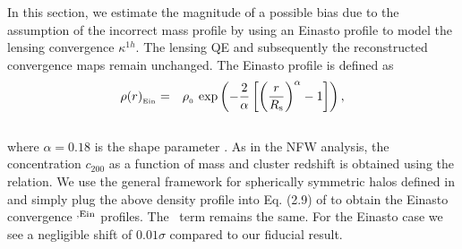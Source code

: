 In this section, we estimate the magnitude of a possible bias due to the assumption of the incorrect mass profile by using an Einasto profile \citep{einasto89} to model the lensing convergence $\kappa^{1h}$.
The lensing QE and subsequently the reconstructed convergence maps remain unchanged.
The Einasto profile is defined as
\begin{eqnarray}
\rho(r)_{_{\rm Ein}} & = &  \rho_{_{0}}\ \mbox{exp}\left( - \frac{2}{\alpha} \left[\left(\frac{r}{R_{\rm s}} \right)^{\alpha} - 1\right]\right),
\label{eq_einasto_density}
\end{eqnarray}\\
where $\alpha = 0.18$ is the shape parameter \citep{ludlow13}. 
As in the NFW analysis, the concentration $c_{200}$ as a function of mass and cluster redshift is obtained using the \citet{duffy08} relation.
We use the general framework for spherically symmetric halos defined in \cite{raghunathan17a} and simply plug the above density profile into Eq. (2.9) of \cite{raghunathan17a} to obtain the Einasto convergence \kappaonehalo$^{,\rm Ein}$ profiles. The \kappatwohalo\ term remains the same. For the Einasto case we see a negligible shift of $0.01\sigma$ compared to our fiducial result.
